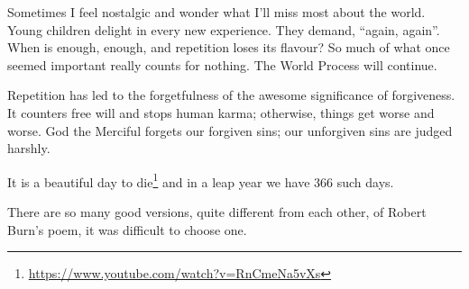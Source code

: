 Sometimes I feel nostalgic and wonder what I'll miss most about the world. Young children delight in every new experience. They demand, ``again, again''. When is enough, enough, and repetition loses its flavour? So much of what once seemed important really counts for nothing. The World Process will continue.

Repetition has led to the forgetfulness of the awesome significance of forgiveness. It counters free will and stops human karma; otherwise, things get worse and worse. God the Merciful forgets our forgiven sins; our unforgiven sins are judged harshly.

It is a beautiful day to die\footnote{\url{https://www.youtube.com/watch?v=RnCmeNa5vXs}} and in a leap year we have 366 such days.

There are so many good versions, quite different from each other, of Robert Burn's poem, it was difficult to choose one.


